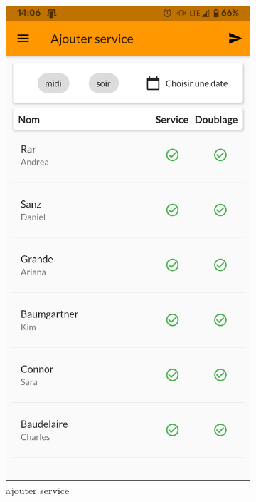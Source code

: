 \begin{figure}[!h]
\begin{subfigure}{.3\textwidth}
            \includegraphics[width=0.9\linewidth]{screenshots/scenario_05/ajout_service_a.png}
            \caption{ajouter service}
            \label{fig:ajout_service}
        \end{subfigure}
        \begin{subfigure}{.3\textwidth}
            \centering

\end{subfigure}
\end{figure}
